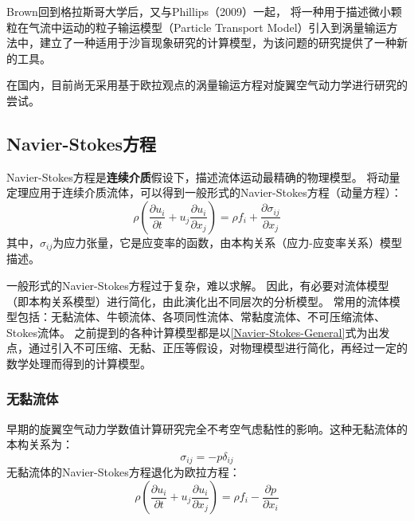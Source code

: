 \documentclass[doctor,openright,twoside,color]{buaathesis}
\begin{document}
Brown回到格拉斯哥大学后，又与Phillips（2009）一起，
将一种用于描述微小颗粒在气流中运动的粒子输运模型（Particle Transport Model）引入到涡量输运方法中，建立了一种适用于沙盲现象研究的计算模型，为该问题的研究提供了一种新的工具。

在国内，目前尚无采用基于欧拉观点的涡量输运方程对旋翼空气动力学进行研究的尝试。


\subsection{Navier-Stokes方程}\label{Navier-Stokes-Equation}
Navier-Stokes方程是\textbf{连续介质}假设下，描述流体运动最精确的物理模型。
将动量定理应用于连续介质流体，可以得到一般形式的Navier-Stokes方程（动量方程）：
\begin{equation}\label{Navier-Stokes-General}
\rho\left( \frac{\partial u_i }{\partial t} + u_j \frac{\partial u_i}{\partial x_j}  \right)
=
\rho f_i + \frac{\partial \sigma_{ij}}{\partial x_j}
\end{equation}
其中，$\sigma_{ij}$为应力张量，它是应变率的函数，由本构关系（应力-应变率关系）模型描述。

一般形式的Navier-Stokes方程过于复杂，难以求解。
因此，有必要对流体模型（即本构关系模型）进行简化，由此演化出不同层次的分析模型。
常用的流体模型包括：无黏流体、牛顿流体、各项同性流体、常黏度流体、不可压缩流体、Stokes流体。
之前提到的各种计算模型都是以\ref{Navier-Stokes-General}式为出发点，通过引入不可压缩、无黏、正压等假设，对物理模型进行简化，再经过一定的数学处理而得到的计算模型。

\subsubsection{无黏流体}
早期的旋翼空气动力学数值计算研究完全不考空气虑黏性的影响。这种无黏流体的本构关系为：
\begin{equation}
\sigma_{ij}
=
-p\delta_{ij}
\end{equation}
无黏流体的Navier-Stokes方程退化为欧拉方程：
\begin{equation}
\rho\left( \frac{\partial u_i }{\partial t} + u_j \frac{\partial u_i}{\partial x_j}  \right)
=
\rho f_i - \frac{\partial p }{\partial x_i}
\end{equation}
\end{document}
